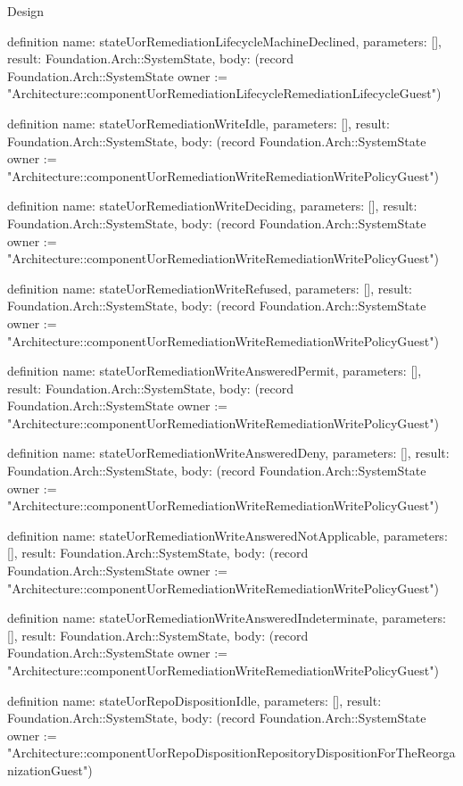 \begin{lexlean}{Design}
\begin{semanticmodule}
definition{
  name: stateUorRemediationLifecycleMachineDeclined,
  parameters: [],
  result: Foundation.Arch::SystemState,
  body: (record Foundation.Arch::SystemState {owner := "Architecture::componentUorRemediationLifecycleRemediationLifecycleGuest"})
}

definition{
  name: stateUorRemediationWriteIdle,
  parameters: [],
  result: Foundation.Arch::SystemState,
  body: (record Foundation.Arch::SystemState {owner := "Architecture::componentUorRemediationWriteRemediationWritePolicyGuest"})
}

definition{
  name: stateUorRemediationWriteDeciding,
  parameters: [],
  result: Foundation.Arch::SystemState,
  body: (record Foundation.Arch::SystemState {owner := "Architecture::componentUorRemediationWriteRemediationWritePolicyGuest"})
}

definition{
  name: stateUorRemediationWriteRefused,
  parameters: [],
  result: Foundation.Arch::SystemState,
  body: (record Foundation.Arch::SystemState {owner := "Architecture::componentUorRemediationWriteRemediationWritePolicyGuest"})
}

definition{
  name: stateUorRemediationWriteAnsweredPermit,
  parameters: [],
  result: Foundation.Arch::SystemState,
  body: (record Foundation.Arch::SystemState {owner := "Architecture::componentUorRemediationWriteRemediationWritePolicyGuest"})
}

definition{
  name: stateUorRemediationWriteAnsweredDeny,
  parameters: [],
  result: Foundation.Arch::SystemState,
  body: (record Foundation.Arch::SystemState {owner := "Architecture::componentUorRemediationWriteRemediationWritePolicyGuest"})
}

definition{
  name: stateUorRemediationWriteAnsweredNotApplicable,
  parameters: [],
  result: Foundation.Arch::SystemState,
  body: (record Foundation.Arch::SystemState {owner := "Architecture::componentUorRemediationWriteRemediationWritePolicyGuest"})
}

definition{
  name: stateUorRemediationWriteAnsweredIndeterminate,
  parameters: [],
  result: Foundation.Arch::SystemState,
  body: (record Foundation.Arch::SystemState {owner := "Architecture::componentUorRemediationWriteRemediationWritePolicyGuest"})
}

definition{
  name: stateUorRepoDispositionIdle,
  parameters: [],
  result: Foundation.Arch::SystemState,
  body: (record Foundation.Arch::SystemState {owner := "Architecture::componentUorRepoDispositionRepositoryDispositionForTheReorganizationGuest"})
}


\end{semanticmodule}
\end{lexlean}
